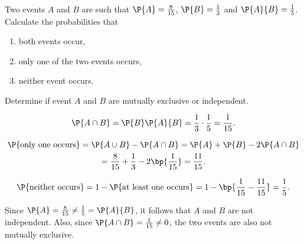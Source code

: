 \begin{problem}
    Two events $A$ and $B$ are such that $\P{A} = \frac{8}{15}$, $\P{B} = \frac{1}{3}$ and $\P{A}{B} = \frac15$. Calculate the probabilities that
    \begin{enumerate}
        \item both events occur,
        \item only one of the two events occurs,
        \item neither event occurs.
    \end{enumerate}
    Determine if event $A$ and $B$ are mutually exclusive or independent.
\end{problem}
\begin{solution}
    \begin{ppart}
        \[\P{A \cap B} = \P{B} \P{A}{B} = \frac13 \cdot \frac15 = \frac1{15}.\]
    \end{ppart}
    \begin{ppart}
        \begin{gather*}
            \P{\text{only one occurs}} = \P{A \cup B} - \P{A \cap B} = \P{A} + \P{B} - 2\P{A \cap B} \\
            = \frac8{15} + \frac13 - 2 \bp{\frac1{15}} = \frac{11}{15}.
        \end{gather*}
    \end{ppart}
    \begin{ppart}
        \[\P{\text{neither occurs}} = 1 - \P{\text{at least one occurs}} = 1 - \bp{\frac1{15} - \frac{11}{15}} = \frac15.\]
    \end{ppart}

    Since $\P{A} = \frac8{15} \neq \frac15 = \P{A}{B}$, it follows that $A$ and $B$ are not independent. Also, since $\P{A \cap B} = \frac1{15} \neq 0$, the two events are also not mutually exclusive.
\end{solution}

